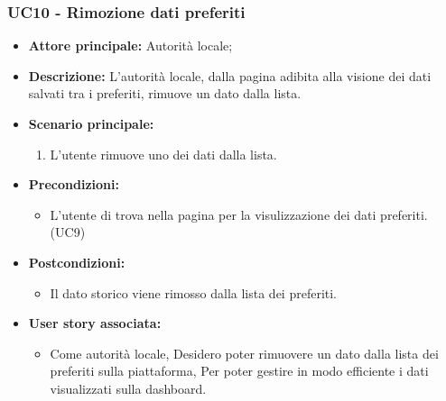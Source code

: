 \subsubsection{UC10 - Rimozione dati preferiti}
\begin{itemize}
    \item \textbf{Attore principale:} Autorità locale;
    \item \textbf{Descrizione:} L’autorità locale, dalla pagina adibita alla visione dei dati salvati tra i preferiti, rimuove un dato dalla lista.
    \item \textbf{Scenario principale:}
          \begin{enumerate}
              \item L'utente rimuove uno dei dati dalla lista.
          \end{enumerate}
    \item \textbf{Precondizioni:}
          \begin{itemize}
              \item  L'utente di trova nella pagina per la visulizzazione dei dati preferiti. (UC9)
          \end{itemize}
    \item \textbf{Postcondizioni:}
          \begin{itemize}
              \item  Il dato storico viene rimosso dalla lista dei preferiti.
          \end{itemize}
    \item \textbf{User story associata:}
          \begin{itemize}
              \item Come autorità locale,
                    Desidero poter rimuovere un dato dalla lista dei preferiti sulla piattaforma,
                    Per poter gestire in modo efficiente i dati visualizzati sulla dashboard.
          \end{itemize}
\end{itemize}